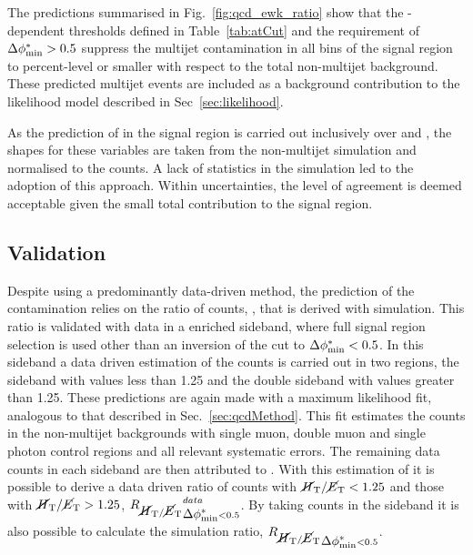 
The predictions summarised in Fig.~\ref{fig:qcd_ewk_ratio} show that 
the \HT-dependent \alphat thresholds defined in Table~\ref{tab:atCut} 
and the requirement of $\mbox{$\Delta\phi^{*}_{\rm min}$} > 0.5$ suppress the multijet
contamination in all bins of the signal region to percent-level or smaller with
respect to the total non-multijet background. These predicted multijet events are 
included as a background contribution to the likelihood model
described in Sec~\ref{sec:likelihood}.

As the prediction of \QCD in the signal region is carried out
inclusively over \nb and \mht, the \QCD shapes for these variables are
taken from the non-multijet simulation and normalised to the \QCD counts. A
lack of statistics in the \QCD simulation led to the adoption of this approach.
Within uncertainties, the level of
agreement is deemed acceptable given the small total \QCD contribution to the
signal region.

\subsection{Validation} 

Despite using a predominantly data-driven method, the prediction of
the \QCD contamination relies on the ratio of \QCD counts, \rmhtmet,
that is derived with simulation. This ratio is validated with data in
a \QCD enriched sideband, where full signal region selection is used
other than an inversion of the \bdphi cut to $\mbox{$\Delta\phi^{*}_{\rm min}$}<0.5$. In this
sideband a data driven estimation of the \QCD counts is carried out in
two regions, the \bdphi sideband with \mhtmet values less than 1.25
and the double sideband with
values greater than 1.25. These predictions are again made with a maximum
likelihood fit, analogous to that described in
Sec.~\ref{sec:qcdMethod}. This fit estimates the counts in the
non-multijet backgrounds with single muon, double muon and single
photon control regions and all relevant systematic errors. The
remaining data counts in each sideband are then attributed to \QCD.
With this estimation of \QCD it is possible to derive a data driven
ratio of \QCD counts with $\mbox{$\mbox{$\cancel{H}_\text{T}$} / \mbox{$\cancel{E}_\text{T}$}$}<1.25$ and those with $\mbox{$\mbox{$\cancel{H}_\text{T}$} / \mbox{$\cancel{E}_\text{T}$}$}>1.25$,
$\mbox{$R_{\mbox{$\cancel{H}_\text{T}$} / \mbox{$\cancel{E}_\text{T}$}}$}_{\mbox{$\Delta\phi^{*}_{\rm min}$}<0.5}^{data}$. By taking \MC counts in the \bdphi
sideband it is also possible to calculate the \mhtmet simulation
ratio, $\mbox{$R_{\mbox{$\cancel{H}_\text{T}$} / \mbox{$\cancel{E}_\text{T}$}}$}_{\mbox{$\Delta\phi^{*}_{\rm min}$}<0.5}$. 

